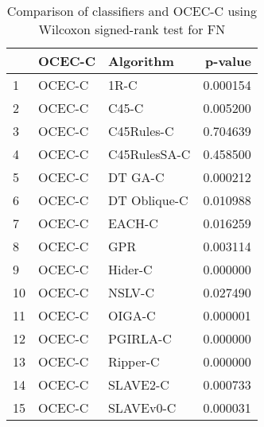\begin{table}
\footnotesize
\caption{Comparison of classifiers and OCEC-C using Wilcoxon signed-rank test for FN}
\label{tab:OCEC-C wilcoxon FN comparison}
\begin{tabular}{lllr}
\hline
 & OCEC-C & Algorithm & p-value \\
\hline
1 & OCEC-C & 1R-C & 0.000154 \\
2 & OCEC-C & C45-C & 0.005200 \\
3 & OCEC-C & C45Rules-C & 0.704639 \\
4 & OCEC-C & C45RulesSA-C & 0.458500 \\
5 & OCEC-C & DT GA-C & 0.000212 \\
6 & OCEC-C & DT Oblique-C & 0.010988 \\
7 & OCEC-C & EACH-C & 0.016259 \\
8 & OCEC-C & GPR & 0.003114 \\
9 & OCEC-C & Hider-C & 0.000000 \\
10 & OCEC-C & NSLV-C & 0.027490 \\
11 & OCEC-C & OIGA-C & 0.000001 \\
12 & OCEC-C & PGIRLA-C & 0.000000 \\
13 & OCEC-C & Ripper-C & 0.000000 \\
14 & OCEC-C & SLAVE2-C & 0.000733 \\
15 & OCEC-C & SLAVEv0-C & 0.000031 \\
\hline
\end{tabular}
\end{table}
